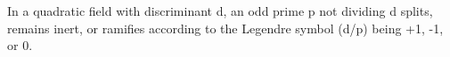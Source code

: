 In a quadratic field with discriminant d, an odd prime p not dividing d splits, remains inert, or ramifies according to the Legendre symbol (d/p) being +1, -1, or 0.
